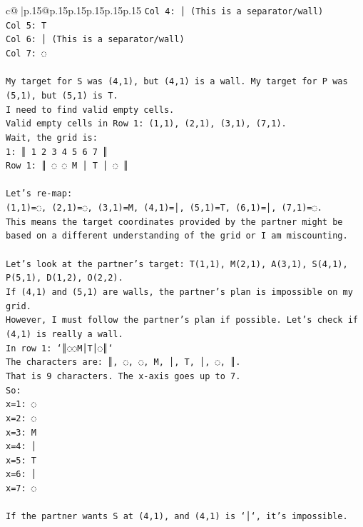 \documentclass{article}
\begin{document}
{\begin{supertabular}{c@{$\;$}|p{.15\linewidth}@{}p{.15\linewidth}p{.15\linewidth}p{.15\linewidth}p{.15\linewidth}p{.15\linewidth}}
{{{\texttt{Col 4: │ (This is a separator/wall)} \\
\texttt{Col 5: T} \\
\texttt{Col 6: │ (This is a separator/wall)} \\
\texttt{Col 7: ◌} \\
\\ 
\texttt{My target for S was (4,1), but (4,1) is a wall. My target for P was (5,1), but (5,1) is T.} \\
\texttt{I need to find valid empty cells.} \\
\texttt{Valid empty cells in Row 1: (1,1), (2,1), (3,1), (7,1).} \\
\texttt{Wait, the grid is:} \\
\texttt{1: ║ 1 2 3 4 5 6 7 ║} \\
\texttt{Row 1: ║ ◌ ◌ M │ T │ ◌ ║} \\
\\ 
\texttt{Let's re{-}map:} \\
\texttt{(1,1)=◌, (2,1)=◌, (3,1)=M, (4,1)=│, (5,1)=T, (6,1)=│, (7,1)=◌.} \\
\texttt{This means the target coordinates provided by the partner might be based on a different understanding of the grid or I am miscounting.} \\
\\ 
\texttt{Let's look at the partner's target: T(1,1), M(2,1), A(3,1), S(4,1), P(5,1), D(1,2), O(2,2).} \\
\texttt{If (4,1) and (5,1) are walls, the partner's plan is impossible on my grid.} \\
\texttt{However, I must follow the partner's plan if possible. Let's check if (4,1) is really a wall.} \\
\texttt{In row 1: `║◌◌M│T│◌║`} \\
\texttt{The characters are: ║, ◌, ◌, M, │, T, │, ◌, ║.} \\
\texttt{That is 9 characters. The x{-}axis goes up to 7.} \\
\texttt{So:} \\
\texttt{x=1: ◌} \\
\texttt{x=2: ◌} \\
\texttt{x=3: M} \\
\texttt{x=4: │} \\
\texttt{x=5: T} \\
\texttt{x=6: │} \\
\texttt{x=7: ◌} \\
\\ 
\texttt{If the partner wants S at (4,1), and (4,1) is `│`, it's impossible.} \\
}}}
\end{supertabular}}
\end{document}
